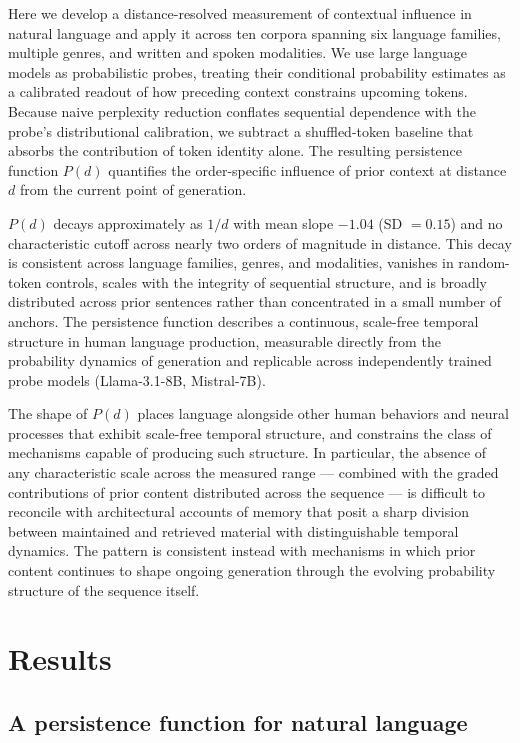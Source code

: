 \documentclass[11pt]{article}
\begin{document}
Here we develop a distance-resolved measurement of contextual influence in natural
language and apply it across ten corpora spanning six language families, multiple
genres, and written and spoken modalities. We use large language models as
probabilistic probes, treating their conditional probability estimates as a
calibrated readout of how preceding context constrains upcoming tokens. Because naive
perplexity reduction conflates sequential dependence with the probe's distributional
calibration, we subtract a shuffled-token baseline that absorbs the contribution of
token identity alone. The resulting persistence function $P(d)$ quantifies the
order-specific influence of prior context at distance $d$ from the current point of
generation.

$P(d)$ decays approximately as $1/d$ with mean slope $-1.04$ (SD $=0.15$) and no
characteristic cutoff across nearly two orders of magnitude in distance. This decay
is consistent across language families, genres, and modalities, vanishes in
random-token controls, scales with the integrity of sequential structure, and is
broadly distributed across prior sentences rather than concentrated in a small number
of anchors. The persistence function describes a continuous, scale-free temporal
structure in human language production, measurable directly from the probability
dynamics of generation and replicable across independently trained probe models
(Llama-3.1-8B, Mistral-7B).

The shape of $P(d)$ places language alongside other human behaviors and neural
processes that exhibit scale-free temporal structure, and constrains the class of
mechanisms capable of producing such structure. In particular, the absence of any
characteristic scale across the measured range --- combined with the graded
contributions of prior content distributed across the sequence --- is difficult to
reconcile with architectural accounts of memory that posit a sharp division between
maintained and retrieved material with distinguishable temporal dynamics. The pattern
is consistent instead with mechanisms in which prior content continues to shape
ongoing generation through the evolving probability structure of the sequence itself.

\section{Results}

\subsection{A persistence function for natural language}
\end{document}

